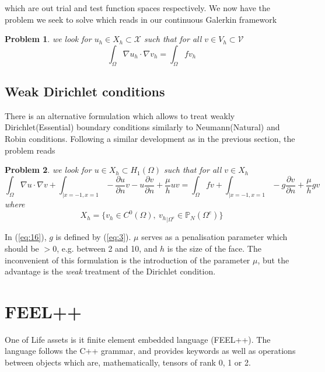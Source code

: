 \documentclass[11pt]{article}
\newtheorem{problem}{Problem}
\begin{document}
which are out trial and test function spaces respectively.  We now
have the problem we seek to solve which reads in our continuous
Galerkin framework
\begin{problem}
  \label{prob:2}
  we look for $u_h \in X_h \subset \mathcal{X}$ such that for all $v
  \in V_h \subset \mathcal{V}$
  \begin{equation}
    \label{eq:20}
    \int_\Omega \nabla u_h \cdot \nabla v_h  = \int_\Omega f v_h
  \end{equation}
\end{problem}

\subsection{Weak Dirichlet conditions}
\label{sec:weak-dirichl-cond}

There is an alternative formulation which allows to treat weakly
Dirichlet(Essential) boundary conditions similarly to Neumann(Natural)
and Robin conditions. Following a similar development as in the previous section, the problem reads
\begin{problem}
  \label{prob:3}
  we look for $u \in X_h \subset H_1(\Omega)$ such that for all $v \in
  X_h$
\begin{equation}
  \label{eq:16}
  \int_\Omega \nabla u \cdot \nabla v +
  \int_{|x=-1,x=1} -\frac{\partial u}{\partial n} v - u \frac{\partial v}{\partial n} + \frac{\mu}{h} u v
  =
  \int_\Omega f v +
  \int_{|x=-1,x=1}  - g \frac{\partial v}{\partial n} + \frac{\mu}{h} g v
\end{equation}
where
\begin{equation}
  \label{eq:19}
  X_h = \Big\{ v_h \in C^0(\Omega),\ {v_h}_{|\Omega^e} \in \mathbb{P}_N( \Omega^e ) \Big\}
\end{equation}
\end{problem}
In (\ref{eq:16}), $g$ is defined by (\ref{eq:3}). $\mu$ serves as a penalisation
parameter which should be $> 0$, e.g. between 2 and 10, and $h$ is the
size of the face. The inconvenient of this formulation is the
introduction of the parameter $\mu$, but the advantage is the
\emph{weak} treatment of the Dirichlet condition.



\newpage
\section{FEEL++}
\label{sec:feel++}

One of Life assets is it finite element embedded language
(FEEL++). The language follows the C++ grammar, and provides keywords
as well as operations between objects which are, mathematically,
tensors of rank 0, 1 or 2.
\end{document}
